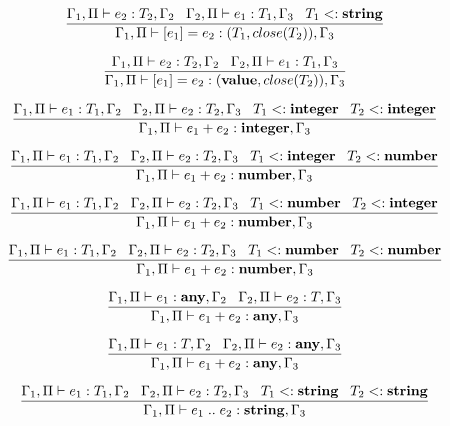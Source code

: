 \[
\dfrac{\Gamma_{1}, \Pi \vdash e_{2}:T_{2}, \Gamma_{2} \;\;\;
       \Gamma_{2}, \Pi \vdash e_{1}:T_{1}, \Gamma_{3} \;\;\;
       T_{1} <: \mathbf{string}}
      {\Gamma_{1}, \Pi \vdash [e_{1}] = e_{2}: (T_{1},close(T_{2})), \Gamma_{3}}
\]

\[
\dfrac{\Gamma_{1}, \Pi \vdash e_{2}:T_{2}, \Gamma_{2} \;\;\;
       \Gamma_{2}, \Pi \vdash e_{1}:T_{1}, \Gamma_{3}}
      {\Gamma_{1}, \Pi \vdash [e_{1}] = e_{2}: (\mathbf{value},close(T_{2})), \Gamma_{3}}
\]

\[
\dfrac{\Gamma_{1}, \Pi \vdash e_{1}:T_{1}, \Gamma_{2} \;\;\;
       \Gamma_{2}, \Pi \vdash e_{2}:T_{2}, \Gamma_{3} \;\;\;
       T_{1} <: \mathbf{integer} \;\;\;
       T_{2} <: \mathbf{integer}}
      {\Gamma_{1}, \Pi \vdash e_{1} + e_{2}:\mathbf{integer}, \Gamma_{3}}
\]

\[
\dfrac{\Gamma_{1}, \Pi \vdash e_{1}:T_{1}, \Gamma_{2} \;\;\;
       \Gamma_{2}, \Pi \vdash e_{2}:T_{2}, \Gamma_{3} \;\;\;
       T_{1} <: \mathbf{integer} \;\;\;
       T_{2} <: \mathbf{number}}
      {\Gamma_{1}, \Pi \vdash e_{1} + e_{2}:\mathbf{number}, \Gamma_{3}}
\]

\[
\dfrac{\Gamma_{1}, \Pi \vdash e_{1}:T_{1}, \Gamma_{2} \;\;\;
       \Gamma_{2}, \Pi \vdash e_{2}:T_{2}, \Gamma_{3} \;\;\;
       T_{1} <: \mathbf{number} \;\;\;
       T_{2} <: \mathbf{integer}}
      {\Gamma_{1}, \Pi \vdash e_{1} + e_{2}:\mathbf{number}, \Gamma_{3}}
\]

\[
\dfrac{\Gamma_{1}, \Pi \vdash e_{1}:T_{1}, \Gamma_{2} \;\;\;
       \Gamma_{2}, \Pi \vdash e_{2}:T_{2}, \Gamma_{3} \;\;\;
       T_{1} <: \mathbf{number} \;\;\;
       T_{2} <: \mathbf{number}}
      {\Gamma_{1}, \Pi \vdash e_{1} + e_{2}:\mathbf{number}, \Gamma_{3}}
\]

\[
\dfrac{\Gamma_{1}, \Pi \vdash e_{1}:\mathbf{any}, \Gamma_{2} \;\;\;
       \Gamma_{2}, \Pi \vdash e_{2}:T, \Gamma_{3}}
      {\Gamma_{1}, \Pi \vdash e_{1} + e_{2}:\mathbf{any}, \Gamma_{3}}
\]

\[
\dfrac{\Gamma_{1}, \Pi \vdash e_{1}:T, \Gamma_{2} \;\;\;
       \Gamma_{2}, \Pi \vdash e_{2}:\mathbf{any}, \Gamma_{3}}
      {\Gamma_{1}, \Pi \vdash e_{1} + e_{2}:\mathbf{any}, \Gamma_{3}}
\]

\[
\dfrac{\Gamma_{1}, \Pi \vdash e_{1}:T_{1}, \Gamma_{2} \;\;\;
       \Gamma_{2}, \Pi \vdash e_{2}:T_{2}, \Gamma_{3} \;\;\;
       T_{1} <: \mathbf{string} \;\;\;
       T_{2} <: \mathbf{string}}
      {\Gamma_{1}, \Pi \vdash e_{1} \; {..} \; e_{2}:\mathbf{string}, \Gamma_{3}}
\]

